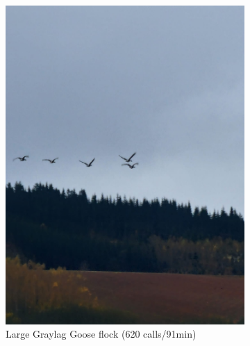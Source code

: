 \documentclass[twocolumn]{article}
\begin{document}
\begin{figure}[h]
\begin{subfigure}{0.31\textwidth}
\includegraphics[width=\textwidth]{06_geese_flight_formation.jpg}
\caption{Large Graylag Goose flock (620 calls/91min)}
\end{subfigure}
\hfill
\begin{subfigure}{0.31\textwidth}
\centering

\end{subfigure}
\end{figure}
\end{document}
